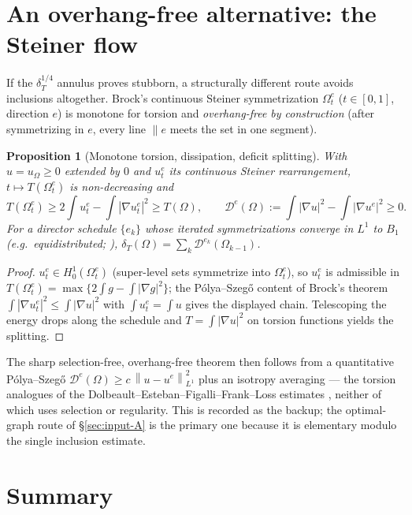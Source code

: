 \documentclass[11pt]{article}
\newtheorem{proposition}[theorem]{Proposition}
\theoremstyle{definition}
\newcommand{\Om}{\Omega}
\newcommand{\dT}{\delta_T}
\newcommand{\norm}[1]{\left\|#1\right\|}
\newcommand{\abs}[1]{\left|#1\right|}
\begin{document}
\section{An overhang-free alternative: the Steiner flow}
\label{sec:steiner}

If the $\dT^{1/4}$ annulus proves stubborn, a structurally different route
avoids inclusions altogether. Brock's continuous Steiner symmetrization
$\Om^e_t$ ($t\in[0,1]$, direction $e$) is monotone for torsion and
\emph{overhang-free by construction} (after symmetrizing in $e$, every
line $\parallel e$ meets the set in one segment).

\begin{proposition}[Monotone torsion, dissipation, deficit splitting]
\label{prop:steiner}
With $u=u_\Om\ge0$ extended by $0$ and $u^e_t$ its continuous Steiner
rearrangement, $t\mapsto T(\Om^e_t)$ is non-decreasing and
\[
   T(\Om^e_t)\ge 2\!\int u^e_t-\!\int\abs{\nabla u^e_t}^2\ge T(\Om),
   \qquad
   \mathcal D^e(\Om):=\int\abs{\nabla u}^2-\int\abs{\nabla u^e}^2\ge0 .
\]
For a director schedule $\{e_k\}$ whose iterated symmetrizations converge
in $L^1$ to $B_1$ \textup{(}e.g.\ equidistributed; \cite{ManiLevitska,
Burchard}\textup{)},
$\dT(\Om)=\sum_k\mathcal D^{e_k}(\Om_{k-1})$.
\end{proposition}

\begin{proof}
$u^e_t\in H^1_0(\Om^e_t)$ (super-level sets symmetrize into $\Om^e_t$), so
$u^e_t$ is admissible in $T(\Om^e_t)=\max\{2\int g-\int|\nabla g|^2\}$; the
P\'olya--Szeg\H{o} content of Brock's theorem
$\int|\nabla u^e_t|^2\le\int|\nabla u|^2$ with $\int u^e_t=\int u$ gives the
displayed chain. Telescoping the energy drops along the schedule and
$T=\int|\nabla u|^2$ on torsion functions yields the splitting.
\end{proof}

The sharp selection-free, overhang-free theorem then follows from a
quantitative P\'olya--Szeg\H{o} $\mathcal D^e(\Om)\ge c\,
\norm{u-u^e}_{L^1}^2$ plus an isotropy averaging --- the torsion analogues
of the Dolbeault--Esteban--Figalli--Frank--Loss estimates \cite{DEFFL},
neither of which uses selection or regularity. This is recorded as the
backup; the optimal-graph route of \S\ref{sec:input-A} is the primary one
because it is elementary modulo the single inclusion estimate.

\section{Summary}
\label{sec:summary}
\end{document}
